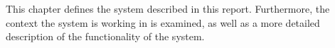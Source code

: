 This chapter defines the system described in this report. Furthermore, the context the system is working in is examined, as well as a more detailed description of the functionality of the system.
